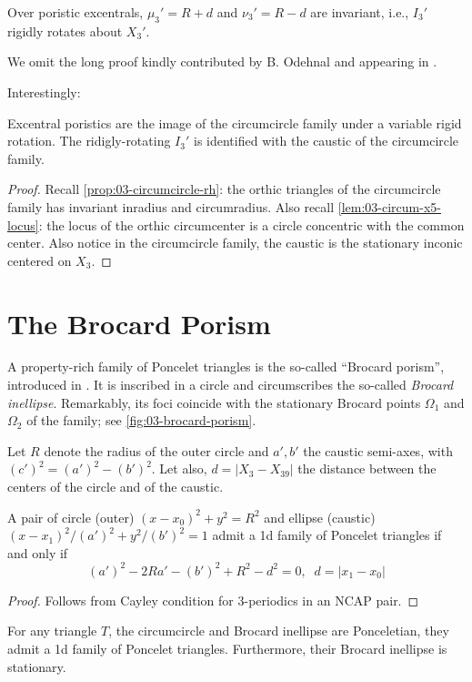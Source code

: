 \begin{proposition}
Over poristic excentrals,  $\mu_3'=R+d$ and $\nu_3'=R-d$ are invariant, i.e., $I_3'$ rigidly rotates about $X_3'$.
\label{prop:03-inconic-x3p}
\end{proposition}

We omit the long proof kindly contributed by B. Odehnal and appearing in \cite[Appendix C]{garcia2020-similarity-I}.

Interestingly:

\begin{theorem}
Excentral poristics are the image of the circumcircle family under a variable rigid rotation. The ridigly-rotating $I_3'$ is identified with the caustic of the circumcircle family.
\end{theorem} 

\begin{proof}
Recall \cref{prop:03-circumcircle-rh}: the orthic triangles of the circumcircle family has invariant inradius and circumradius. Also recall \cref{lem:03-circum-x5-locus}: the locus of the orthic circumcenter is a circle concentric with the common center. Also notice in the circumcircle family, the caustic is the stationary inconic centered on $X_3$.
\end{proof}

\section{The Brocard Porism}
 
A property-rich family of Poncelet triangles is the so-called ``Brocard porism'', introduced in  \cite{bradley2007-brocard,shail1996-brocard, bradley2011-brocard}. It is inscribed in a circle and circumscribes the so-called {\em Brocard inellipse}. Remarkably, its foci coincide with the stationary Brocard points $\Omega_1$ and $\Omega_2$ of the family; see \cref{fig:03-brocard-porism}.

Let $R$ denote the radius of the outer circle and $a',b'$ the caustic semi-axes, with $(c')^2=(a')^2-(b')^2$. Let also, $d=|X_{3}-X_{39}|$ the distance between the centers of the circle and of the caustic.

\begin{proposition}
A pair of circle (outer) $(x-x_0)^2+y^2=R^2$ and ellipse (caustic) $(x-x_1)^2/(a')^2+y^2/(b')^2=1$ admit a 1d family of Poncelet triangles if and only if 
\[(a')^2  - 2 R a'- (b')^2 +  R^2-d^2=0,\;\; d=|x_1-x_0| \]
\end{proposition}
\begin{proof}
  Follows from Cayley condition for 3-periodics in an NCAP pair.
\end{proof}
\begin{proposition}
For any triangle $T$, the circumcircle and Brocard inellipse are Ponceletian, they admit a 1d family of Poncelet triangles. Furthermore, their Brocard inellipse is stationary.
\label{prop:04-broc-inellipse-stationary}
\end{proposition}


